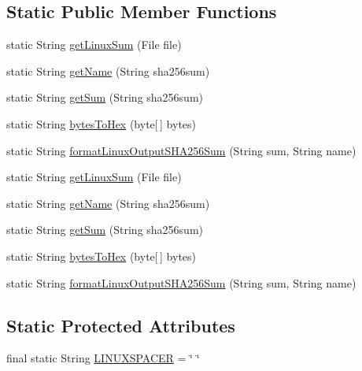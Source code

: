 \subsection*{Static Public Member Functions}
\begin{DoxyCompactItemize}
\item 
static String \hyperlink{class_c_a_s_u_a_l_1_1crypto_1_1_s_h_a256sum_a54c94bb634aeea42b0bf8705afc7a8fb}{get\-Linux\-Sum} (File file)
\item 
static String \hyperlink{class_c_a_s_u_a_l_1_1crypto_1_1_s_h_a256sum_a0f1178a4624b6576e5f7e56b2a2df813}{get\-Name} (String sha256sum)
\item 
static String \hyperlink{class_c_a_s_u_a_l_1_1crypto_1_1_s_h_a256sum_ac56c9bd745fb0e31abb7a88acd2f8f35}{get\-Sum} (String sha256sum)
\item 
static String \hyperlink{class_c_a_s_u_a_l_1_1crypto_1_1_s_h_a256sum_a69c267e92b86486de7152159ff51d26c}{bytes\-To\-Hex} (byte\mbox{[}$\,$\mbox{]} bytes)
\item 
static String \hyperlink{class_c_a_s_u_a_l_1_1crypto_1_1_s_h_a256sum_a68756d611d2cb8c028dfc57e1b2d4128}{format\-Linux\-Output\-S\-H\-A256\-Sum} (String sum, String name)
\item 
static String \hyperlink{class_c_a_s_u_a_l_1_1crypto_1_1_s_h_a256sum_a54c94bb634aeea42b0bf8705afc7a8fb}{get\-Linux\-Sum} (File file)
\item 
static String \hyperlink{class_c_a_s_u_a_l_1_1crypto_1_1_s_h_a256sum_a0f1178a4624b6576e5f7e56b2a2df813}{get\-Name} (String sha256sum)
\item 
static String \hyperlink{class_c_a_s_u_a_l_1_1crypto_1_1_s_h_a256sum_ac56c9bd745fb0e31abb7a88acd2f8f35}{get\-Sum} (String sha256sum)
\item 
static String \hyperlink{class_c_a_s_u_a_l_1_1crypto_1_1_s_h_a256sum_a69c267e92b86486de7152159ff51d26c}{bytes\-To\-Hex} (byte\mbox{[}$\,$\mbox{]} bytes)
\item 
static String \hyperlink{class_c_a_s_u_a_l_1_1crypto_1_1_s_h_a256sum_a68756d611d2cb8c028dfc57e1b2d4128}{format\-Linux\-Output\-S\-H\-A256\-Sum} (String sum, String name)
\end{DoxyCompactItemize}
\subsection*{Static Protected Attributes}
\begin{DoxyCompactItemize}
\item 
final static String \hyperlink{class_c_a_s_u_a_l_1_1crypto_1_1_s_h_a256sum_aa55eabd0c04d0ff960de5ca134e38a02}{L\-I\-N\-U\-X\-S\-P\-A\-C\-E\-R} = \char`\"{} \char`\"{}
\end{DoxyCompactItemize}


